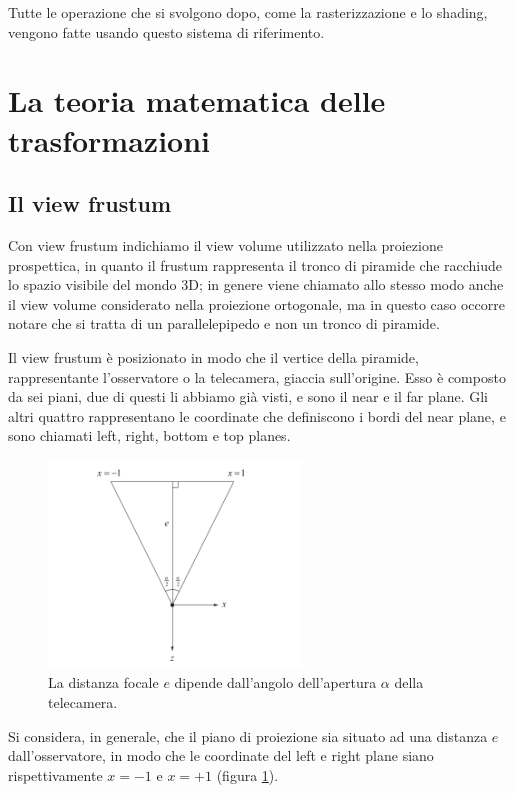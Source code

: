Tutte le operazione che si svolgono dopo, come la rasterizzazione e lo shading, vengono fatte usando questo sistema di riferimento.

\section{La teoria matematica delle trasformazioni}

\subsection{Il view frustum}
Con view frustum indichiamo il view volume utilizzato nella proiezione prospettica, in quanto il frustum rappresenta il tronco di piramide che racchiude lo spazio visibile del mondo 3D; in genere viene chiamato allo stesso modo anche il view volume considerato nella proiezione ortogonale, ma in questo caso occorre notare che si tratta di un parallelepipedo e non un tronco di piramide.

Il view frustum è posizionato in modo che il vertice della piramide, rappresentante l'osservatore o la telecamera, giaccia sull'origine. Esso è composto da sei piani, due di questi li abbiamo già visti, e sono il near e il far plane. Gli altri quattro rappresentano le coordinate che definiscono i bordi del near plane, e sono chiamati left, right, bottom e top planes.


\begin{figure}[htbp]
\centering
\includegraphics[width=0.6\textwidth]{images/frustum/frustum-x.png}
\caption{La distanza focale $e$ dipende dall'angolo dell'apertura $\alpha$ della telecamera. \label{frustum-x}}
\end{figure}

Si considera, in generale, che il piano di proiezione sia situato ad una distanza $e$ dall'osservatore, in modo che le coordinate del left e right plane siano rispettivamente $x=-1$ e $x=+1$ (figura \ref{frustum-x}).

